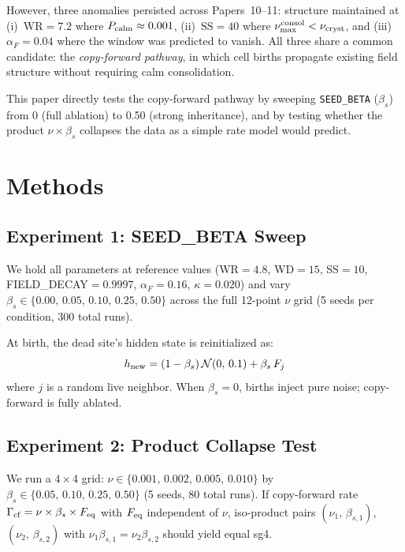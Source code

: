 \documentclass[11pt]{article}
\begin{document}
However, three anomalies persisted across Papers~10--11: structure maintained
at (i)~$\text{WR}=7.2$ where $P_{\rm calm}\approx 0.001$, (ii)~$\text{SS}=40$
where $\nu_{\rm max}^{\rm consol} < \nu_{\rm cryst}$, and (iii)~$\alpha_F=0.04$
where the window was predicted to vanish. All three share a common candidate:
the \emph{copy-forward pathway}, in which cell births propagate existing field
structure without requiring calm consolidation.

This paper directly tests the copy-forward pathway by sweeping \texttt{SEED\_BETA}
($\beta_s$) from 0 (full ablation) to 0.50 (strong inheritance), and by
testing whether the product $\nu \times \beta_s$ collapses the data as a
simple rate model would predict.

\section{Methods}

\subsection{Experiment 1: SEED\_BETA Sweep}

We hold all parameters at reference values (WR$=4.8$, WD$=15$, SS$=10$,
FIELD\_DECAY$=0.9997$, $\alpha_F=0.16$, $\kappa=0.020$) and vary $\beta_s
\in \{0.00,\,0.05,\,0.10,\,0.25,\,0.50\}$ across the full 12-point $\nu$
grid (5 seeds per condition, 300 total runs).

At birth, the dead site's hidden state is reinitialized as:
\[
h_{\rm new} = (1-\beta_s)\,\mathcal{N}(0,\,0.1) + \beta_s\,F_j
\]
where $j$ is a random live neighbor. When $\beta_s=0$, births inject pure
noise; copy-forward is fully ablated.

\subsection{Experiment 2: Product Collapse Test}

We run a $4\times4$ grid: $\nu \in \{0.001,\,0.002,\,0.005,\,0.010\}$ by
$\beta_s \in \{0.05,\,0.10,\,0.25,\,0.50\}$ (5 seeds, 80 total runs). If
copy-forward rate $\Gamma_{\rm cf} = \nu \times \beta_s \times F_{\rm eq}$
with $F_{\rm eq}$ independent of $\nu$, iso-product pairs
$(\nu_1,\,\beta_{s,1})$, $(\nu_2,\,\beta_{s,2})$ with
$\nu_1\beta_{s,1} = \nu_2\beta_{s,2}$ should yield equal sg4.
\end{document}
